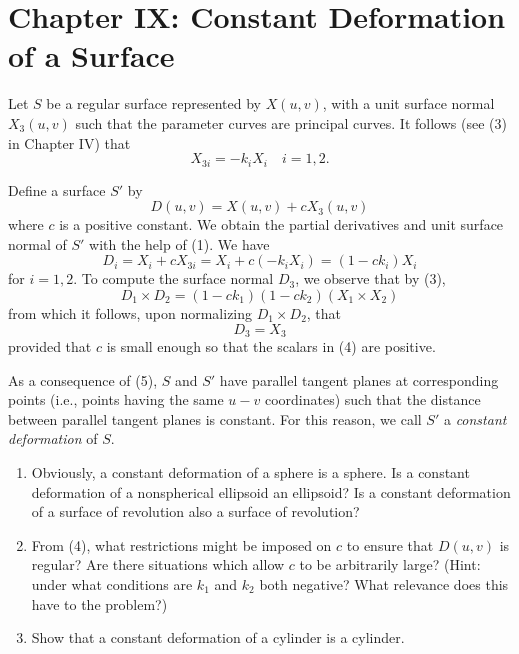 \documentclass{book}
\begin{document}
\chapter*{Chapter IX: Constant Deformation of a Surface}

\setcounter{equation}{0}

Let $S$ be a regular surface represented by $X(u,v)$, with a unit surface normal $X_{3}(u,v)$ such that the parameter curves are principal curves. It follows (see (3) in Chapter IV) that
\begin{equation}
X_{3i} = - k_{i} X_{i} \quad i= 1,2.
\end{equation}

Define a surface $S'$ by
\begin{equation}
D(u,v) = X(u,v) + cX_{3}(u,v)
\end{equation}
where $c$ is a positive constant. We obtain the partial derivatives and unit surface normal of $S'$ with the help of (1). We have
\begin{equation}
D_{i} = X_{i} + cX_{3i} = X_{i} + c(- k_{i} X_{i}) = (1 - ck_{i}) X_{i}
\end{equation}
for $i = 1,2$. To compute the surface normal $D_{3}$, we observe that by (3),
\begin{equation}
D_{1} \times D_{2} = (1 - ck_{1}) (1 - ck_{2}) (X_{1} \times X_{2})
\end{equation}
from which it follows, upon normalizing $D_{1} \times D_{2}$, that
\begin{equation}
D_{3} = X_{3}
\end{equation}
provided that $c$ is small enough so that the scalars in (4) are positive.

As a consequence of (5), $S$ and $S'$ have parallel tangent planes at corresponding points (i.e., points having the same $u-v$ coordinates) such that the distance between parallel tangent planes is constant. For this reason, we call $S'$ a \emph{constant deformation} of $S$.

\begin{enumerate}
  \item[1.] Obviously, a constant deformation of a sphere is a sphere. Is a constant deformation of a nonspherical ellipsoid an ellipsoid? Is a constant deformation of a surface of revolution also a surface of revolution?
  \item[2.] From (4), what restrictions might be imposed on $c$ to ensure that $D(u,v)$ is regular? Are there situations which allow $c$ to be arbitrarily large? (Hint: under what conditions are $k_{1}$ and $k_{2}$ both negative? What relevance does this have to the problem?)
  \item[3.] Show that a constant deformation of a cylinder is a cylinder.
\end{enumerate}
\end{document}
